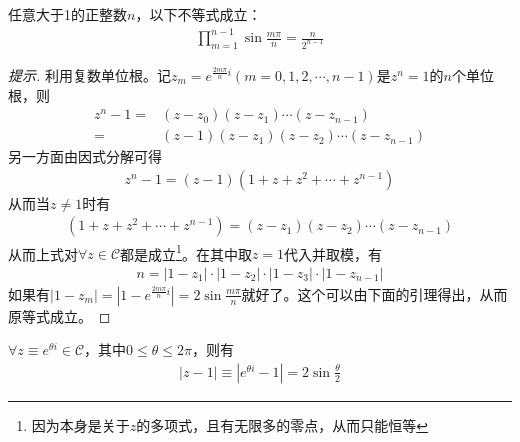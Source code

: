  \begin{example}
   任意大于1的正整数$n$，以下不等式成立：
   \begin{align*}
     \prod_{m=1}^{n-1}\sin\frac{m\pi}{n}=\frac{n}{2^{n-1}}
   \end{align*}
 \end{example}
 \begin{proof}[提示]
   利用复数单位根。记$z_m=e^{\frac{2m\pi}{n}i}(m=0,1,2,\cdots,n-1)$是$z^n=1$的$n$个单位根，则
   \begin{align*}
     z^n - 1 ={}& (z-z_0)(z-z_1)\cdots(z-z_{n-1})\\
     ={}&(z-1)(z-z_1)(z-z_2)\cdots(z-z_{n-1})
   \end{align*}
   另一方面由因式分解可得
   \begin{align*}
     z^n - 1 = (z - 1)(1 + z + z^2 + \cdots + z^{n-1})
   \end{align*}
   从而当$z\ne1$时有
   \begin{align*}
     (1 + z + z^2 + \cdots + z^{n-1}) = (z-z_1)(z-z_2)\cdots(z-z_{n-1})
   \end{align*}
   从而上式对$\forall z\in\mathcal{C}$都是成立\footnote{因为本身是关于$z$的多项式，且有无限多的零点，从而只能恒等}。在其中取$z=1$代入并取模，有
   \begin{align*}
     n=|1-z_1|\cdot |1-z_2|\cdot |1-z_3| \cdot |1-z_{n-1}|
   \end{align*}
   如果有$|1-z_m|=|1-e^{\frac{2m\pi}{n} i}|=2\sin\frac{m\pi}{n} $就好了。这个可以由下面的引理得出，从而原等式成立。
 \end{proof}

 \begin{lemma}
   $\forall z\equiv e^{\theta i}\in\mathcal{C}$，其中$0\le\theta\le2\pi$，则有
   \begin{align*}
     \left| z - 1 \right| \equiv \left| e^{\theta i} - 1 \right| = 2\sin\frac\theta2
   \end{align*}
 \end{lemma}

